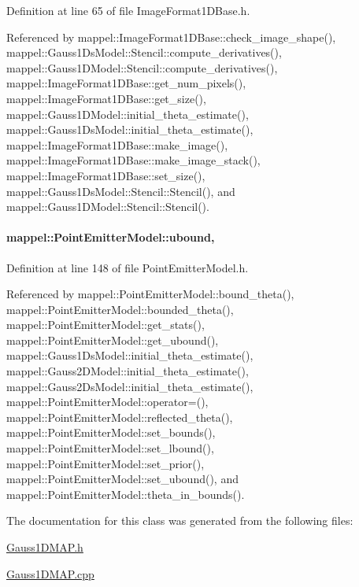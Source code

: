 Definition at line 65 of file Image\+Format1\+D\+Base.\+h.



Referenced by mappel\+::\+Image\+Format1\+D\+Base\+::check\+\_\+image\+\_\+shape(), mappel\+::\+Gauss1\+Ds\+Model\+::\+Stencil\+::compute\+\_\+derivatives(), mappel\+::\+Gauss1\+D\+Model\+::\+Stencil\+::compute\+\_\+derivatives(), mappel\+::\+Image\+Format1\+D\+Base\+::get\+\_\+num\+\_\+pixels(), mappel\+::\+Image\+Format1\+D\+Base\+::get\+\_\+size(), mappel\+::\+Gauss1\+D\+Model\+::initial\+\_\+theta\+\_\+estimate(), mappel\+::\+Gauss1\+Ds\+Model\+::initial\+\_\+theta\+\_\+estimate(), mappel\+::\+Image\+Format1\+D\+Base\+::make\+\_\+image(), mappel\+::\+Image\+Format1\+D\+Base\+::make\+\_\+image\+\_\+stack(), mappel\+::\+Image\+Format1\+D\+Base\+::set\+\_\+size(), mappel\+::\+Gauss1\+Ds\+Model\+::\+Stencil\+::\+Stencil(), and mappel\+::\+Gauss1\+D\+Model\+::\+Stencil\+::\+Stencil().

\paragraph[{\texorpdfstring{ubound}{ubound}}]{ mappel\+::\+Point\+Emitter\+Model\+::ubound\hspace{0.3cm}{\ttfamily [protected]}, {\ttfamily [inherited]}}\hypertarget{classmappel_1_1PointEmitterModel_a35b883e84b6a2e0093bdf482c623beef}{}\label{classmappel_1_1PointEmitterModel_a35b883e84b6a2e0093bdf482c623beef}


Definition at line 148 of file Point\+Emitter\+Model.\+h.



Referenced by mappel\+::\+Point\+Emitter\+Model\+::bound\+\_\+theta(), mappel\+::\+Point\+Emitter\+Model\+::bounded\+\_\+theta(), mappel\+::\+Point\+Emitter\+Model\+::get\+\_\+stats(), mappel\+::\+Point\+Emitter\+Model\+::get\+\_\+ubound(), mappel\+::\+Gauss1\+Ds\+Model\+::initial\+\_\+theta\+\_\+estimate(), mappel\+::\+Gauss2\+D\+Model\+::initial\+\_\+theta\+\_\+estimate(), mappel\+::\+Gauss2\+Ds\+Model\+::initial\+\_\+theta\+\_\+estimate(), mappel\+::\+Point\+Emitter\+Model\+::operator=(), mappel\+::\+Point\+Emitter\+Model\+::reflected\+\_\+theta(), mappel\+::\+Point\+Emitter\+Model\+::set\+\_\+bounds(), mappel\+::\+Point\+Emitter\+Model\+::set\+\_\+lbound(), mappel\+::\+Point\+Emitter\+Model\+::set\+\_\+prior(), mappel\+::\+Point\+Emitter\+Model\+::set\+\_\+ubound(), and mappel\+::\+Point\+Emitter\+Model\+::theta\+\_\+in\+\_\+bounds().



The documentation for this class was generated from the following files\+:\begin{DoxyCompactItemize}
\item 
\hyperlink{Gauss1DMAP_8h}{Gauss1\+D\+M\+A\+P.\+h}\item 
\hyperlink{Gauss1DMAP_8cpp}{Gauss1\+D\+M\+A\+P.\+cpp}\end{DoxyCompactItemize}

